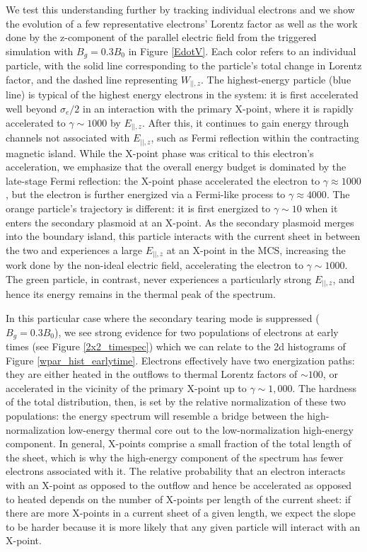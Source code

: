 We test this understanding further by tracking individual electrons and we show the evolution of a few representative electrons' Lorentz factor as well as the work done by the z-component of the parallel electric field from the triggered simulation with $B_{g}=0.3B_{0}$ in Figure \ref{EdotV}.  Each color refers to an individual particle, with the solid line corresponding to the particle's total change in Lorentz factor, and the dashed line representing $W_{||,z}$.  The highest-energy particle (blue line) is typical of the highest energy electrons in the system: it is first accelerated well beyond $\sigma_{e}/2$ in an interaction with the primary X-point, where it is rapidly accelerated to $\gamma \sim 1000$ by $E_{||,z}$.  After this, it continues to gain energy through channels not associated with $E_{||,z}$, such as Fermi reflection within the contracting magnetic island.  While the X-point phase was critical to this electron's acceleration, we emphasize that the overall energy budget is dominated by the late-stage Fermi reflection: the X-point phase accelerated the electron to $\gamma \approx 1000$, but the electron is further energized via a Fermi-like process to $\gamma \approx 4000$. The orange particle's trajectory is different: it is first energized to $\gamma \sim 10$ when it enters the secondary plasmoid at an X-point.  As the secondary plasmoid merges into the boundary island, this particle interacts with the current sheet in between the two and experiences a large $E_{||,z}$ at an X-point in the MCS, increasing the work done by the non-ideal electric field, accelerating the electron to $\gamma \sim 1000$.  The green particle, in contrast, never experiences a particularly strong $E_{||,z}$, and hence its energy remains in the thermal peak of the spectrum.  

In this particular case where the secondary tearing mode is suppressed ($B_{g}=0.3B_{0}$), we see strong evidence for two populations of electrons at early times (see Figure \ref{2x2_timespec}) which we can relate to the 2d histograms of Figure \ref{wpar_hist_earlytime}.  Electrons effectively have two energization paths: they are either heated in the outflows to thermal Lorentz factors of $\sim100$, or accelerated in the vicinity of the primary X-point up to $\gamma \sim 1,000$.  The hardness of the total distribution, then, is set by the relative normalization of these two populations: the energy spectrum will resemble a bridge between the high-normalization low-energy thermal core out to the low-normalization high-energy component.  In general, X-points comprise a small fraction of the total length of the sheet, which is why the high-energy component of the spectrum has fewer electrons associated with it.  The relative probability that an electron interacts with an X-point as opposed to the outflow and hence be accelerated as opposed to heated depends on the number of X-points per length of the current sheet: if there are more X-points in a current sheet of a given length, we expect the slope to be harder because it is more likely that any given particle will interact with an X-point.  

